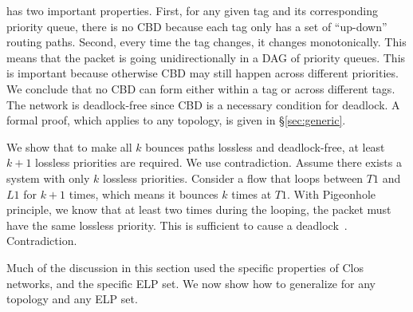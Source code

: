 
 \sysname{} has two
important properties. First, for any given tag and its corresponding priority
queue, there is no CBD because each tag only has a set of ``up-down'' routing
paths.  Second, every time the tag changes, it changes monotonically. This means
that the packet is going unidirectionally in a DAG of priority queues. This is
important because otherwise CBD may still happen across different priorities.
We conclude that no CBD can form either within a tag or across different tags.
The network is deadlock-free since CBD is a necessary condition for deadlock.  A
formal proof, which applies to any topology, is given in \S\ref{sec:generic}.

 We show that
to make all $k$ bounces paths lossless and deadlock-free, at least $k+1$
lossless priorities are required. We use contradiction.  Assume there exists a
system with only $k$ lossless priorities. Consider a flow that loops between
$T1$ and $L1$ for $k+1$ times, which means it bounces $k$ times at $T1$. With
Pigeonhole principle, we know that at least two times during the looping, the
packet must have the same lossless priority. This is sufficient to cause
a deadlock~\cite{hu2016deadlocks}. Contradiction.


Much of the discussion in this section used the specific properties of Clos
networks, and the specific ELP set. We now show how to generalize \sysname{} for
any topology and any ELP set.
